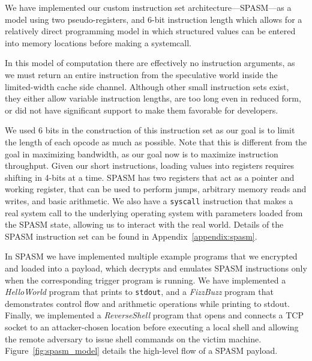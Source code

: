 We have implemented our custom instruction set architecture---SPASM---as a model
using two pseudo-registers, and 6-bit instruction length which allows for a
relatively direct programming model in which structured values can be entered
into memory locations before making a systemcall.


%

In this model of computation there are effectively no instruction arguments, as
we must return an entire instruction from the speculative world inside the
limited-width cache side channel. Although other small instruction sets exist,
they either allow variable instruction lengths, are too long even in reduced
form, or did not have significant support to make them favorable for developers.

We used 6 bits in the construction of this instruction set as our goal is to
limit the length of each opcode as much as possible. Note that this is different
from the goal in maximizing bandwidth, as our goal now is to maximize
instruction throughput. Given our short instructions, loading values into
registers requires shifting in 4-bits at a time. SPASM has two registers that
act as a pointer and working register, that can be used to perform jumps,
arbitrary memory reads and writes, and basic arithmetic. We also have a
\texttt{syscall} instruction that makes a real system call to the underlying
operating system with parameters loaded from the SPASM state, allowing us to
interact with the real world. Details of the SPASM instruction set can be found
in Appendix~\ref{appendix:spasm}. 

In SPASM we have implemented multiple example programs that we encrypted and
loaded into a \speculake payload, which decrypts and emulates SPASM instructions
only when the corresponding trigger program is running. We have implemented a
\textit{HelloWorld} program that prints to \texttt{stdout}, and a
\textit{FizzBuzz} program that demonstrates control flow and arithmetic
operations while printing to stdout. Finally, we implemented a
\textit{ReverseShell} program that opens and connects a TCP socket to an
attacker-chosen location before executing a local shell and allowing the remote
adversary to issue shell commands on the victim machine.
Figure~\ref{fig:spasm_model} details the high-level flow of a SPASM payload.


